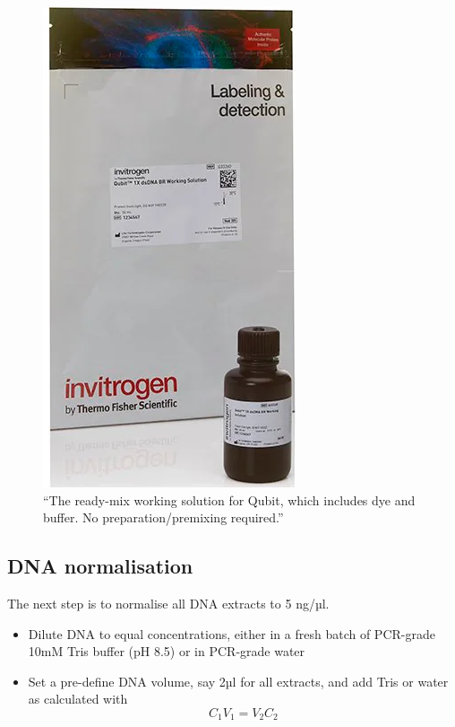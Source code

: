 \documentclass[
]{book}
\providecommand{\tightlist}{%
  \setlength{\itemsep}{0pt}\setlength{\parskip}{0pt}}
\begin{document}
\begin{figure}
\centering
\includegraphics{./img/qubit.png}
\caption{``The ready-mix working solution for Qubit, which includes dye and buffer. No preparation/premixing required.''}
\end{figure}

\hypertarget{dna-normalisation}{%
\subsection{DNA normalisation}\label{dna-normalisation}}

The next step is to normalise all DNA extracts to 5 ng/µl.

\begin{itemize}
\tightlist
\item
  Dilute DNA to equal concentrations, either in a fresh batch of PCR-grade 10mM Tris buffer (pH 8.5) or in PCR-grade water\\
\item
  Set a pre-define DNA volume, say 2µl for all extracts, and add Tris or water as calculated with\\
  \[ C_1V_1 = V_2 C_2 \]\\
  \strut \\
\end{itemize}
\end{document}
